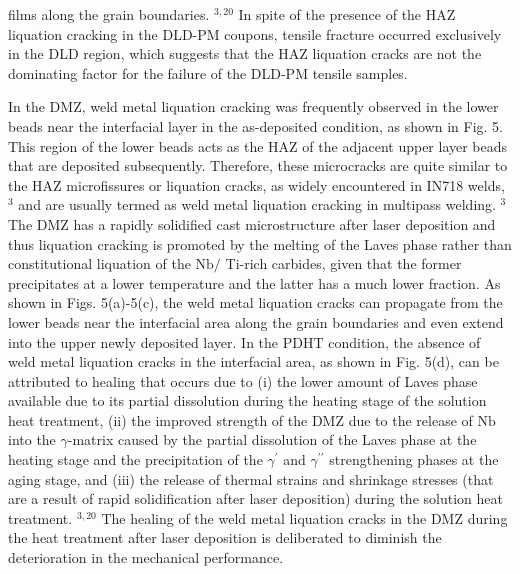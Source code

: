\documentclass[10pt]{article}
\begin{document}
films along the grain boundaries. ${ }^{3,20}$ In spite of the presence of the HAZ liquation cracking in the DLD-PM coupons, tensile fracture occurred exclusively in the DLD region, which suggests that the HAZ liquation cracks are not the dominating factor for the failure of the DLD-PM tensile samples.

In the DMZ, weld metal liquation cracking was frequently observed in the lower beads near the interfacial layer in the as-deposited condition, as shown in Fig. 5. This region of the lower beads acts as the HAZ of the adjacent upper layer beads that are deposited subsequently. Therefore, these microcracks are quite similar to the HAZ microfissures or liquation cracks, as widely encountered in IN718 welds, ${ }^{3}$ and are usually termed as weld metal liquation cracking in multipass welding. ${ }^{3}$ The DMZ has a rapidly solidified cast microstructure after laser deposition and thus liquation cracking is promoted by the melting of the Laves phase rather than constitutional liquation of the $\mathrm{Nb} /$ Ti-rich carbides, given that the former precipitates at a lower temperature and the latter has a much lower fraction. As shown in Figs. 5(a)-5(c), the weld metal liquation cracks can propagate from the lower beads near the interfacial area along the grain boundaries and even extend into the upper newly deposited layer. In the PDHT condition, the absence of weld metal liquation cracks in the interfacial area, as shown in Fig. 5(d), can be attributed to healing that occurs due to (i) the lower amount of Laves phase available due to its partial dissolution during the heating stage of the solution heat treatment, (ii) the improved strength of the DMZ due to the release of $\mathrm{Nb}$ into the $\gamma$-matrix caused by the partial dissolution of the Laves phase at the heating stage and the precipitation of the $\gamma^{\prime}$ and $\gamma^{\prime \prime}$ strengthening phases at the aging stage, and (iii) the release of thermal strains and shrinkage stresses (that are a result of rapid solidification after laser deposition) during the solution heat treatment. ${ }^{3,20}$ The healing of the weld metal liquation cracks in the DMZ during the heat treatment after laser deposition is deliberated to diminish the deterioration in the mechanical performance.
\end{document}
